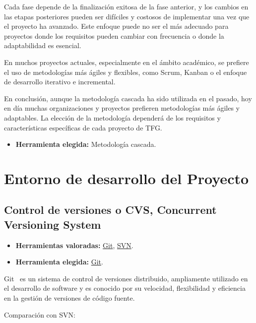 Cada fase depende de la finalización exitosa de la fase anterior, y los cambios en las etapas posteriores pueden ser difíciles y costosos de implementar una vez que el proyecto ha avanzado. Este enfoque puede no ser el más adecuado para proyectos donde los requisitos pueden cambiar con frecuencia o donde la adaptabilidad es esencial.

En muchos proyectos actuales, especialmente en el ámbito académico, se prefiere el uso de metodologías más ágiles y flexibles, como Scrum, Kanban o el enfoque de desarrollo iterativo e incremental.

En conclusión, aunque la metodología cascada ha sido utilizada en el pasado, hoy en día muchas organizaciones y proyectos prefieren metodologías más ágiles y adaptables. La elección de la metodología dependerá de los requisitos y características específicas de cada proyecto de TFG.

\begin{itemize}
	\item \textbf{Herramienta elegida:} Metodología cascada.
\end{itemize}

\section{Entorno de desarrollo del Proyecto}
\subsection{Control de versiones o CVS, Concurrent Versioning System}\label{4:controlVersiones}
\begin{itemize}
    \item \textbf{Herramientas valoradas:} \href{https://git-scm.com/}{Git}, \href{https://subversion.apache.org/}{SVN}.
    \item \textbf{Herramienta elegida:} \href{https://git-scm.com/}{Git}.
\end{itemize}
Git~\cite{misc:Git} es un sistema de control de versiones distribuido, ampliamente utilizado en el desarrollo de software y es conocido por su velocidad, flexibilidad y eficiencia en la gestión de versiones de código fuente.

Comparación con SVN:

